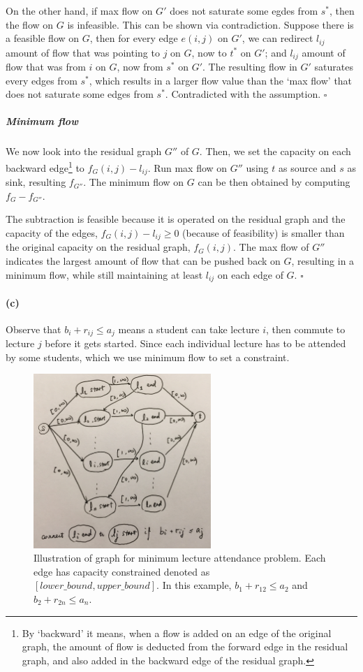 \documentclass[12pt]{article}
\begin{document}
On the other hand, if max flow on $G'$ does not saturate some egdes from $s^*$, then the flow on $G$ is infeasible. This can be shown via contradiction. Suppose there is a feasible flow on $G$, then for every edge $e(i,j)$ on $G'$, we can redirect $l_{ij}$ amount of flow that was pointing to $j$ on $G$, now to $t^*$ on $G'$; and $l_{ij}$ amount of flow that was from $i$ on $G$, now from $s^*$ on $G'$. The resulting flow in $G'$ saturates every edges from $s^*$, which results in a larger flow value than the `max flow' that does not saturate some edges from $s^*$. Contradicted with the assumption. $\square$

\subparagraph{Minimum flow} We now look into the residual graph $G''$ of $G$. Then, we set the capacity on each backward edge\footnote{By `backward' it means, when a flow is added on an edge of the original graph, the amount of flow is deducted from the forward edge in the residual graph, and also added in the backward edge of the residual graph.} to $f_G(i,j) - l_{ij}$. Run max flow on $G''$ using $t$ as source and $s$ as sink, resulting $f_{G''}$. The minimum flow on $G$ can be then obtained by computing $f_G - f_{G''}$.

The subtraction is feasible because it is operated on the residual graph and the capacity of the edges, $f_G(i,j) - l_{ij} \geq 0$ (because of feasibility) is smaller than the original capacity on the residual graph, $f_G(i,j)$. The max flow of $G''$ indicates the largest amount of flow that can be pushed back on $G$, resulting in a minimum flow, while still maintaining at least $l_{ij}$ on each edge of $G$. $\square$

\paragraph{(c)}
Observe that $b_i + r_{ij} \leq a_j$ means a student can take lecture $i$, then commute to lecture $j$ before it gets started. Since each individual lecture has to be attended by some students, which we use minimum flow to set a constraint. 

\begin{figure}[h!]
	\centering
	\includegraphics[width=0.6\textwidth]{2-c.jpg}
	\caption{Illustration of graph for minimum lecture attendance problem. Each edge has capacity constrained denoted as $[lower\_bound, upper\_bound]$. In this example, $b_1 + r_{12} \leq a_2$ and $b_2 + r_{2n} \leq a_n$.} \label{fig:2-c}
\end{figure}
\end{document}
